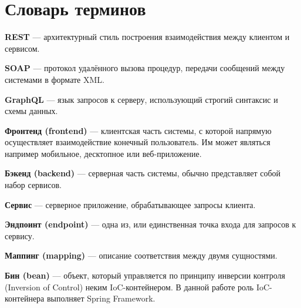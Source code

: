 \chapter*{Словарь терминов}             %

\textbf{REST} --- архитектурный стиль построения взаимодействия между клиентом и сервисом.

\textbf{SOAP} --- протокол удалённого вызова процедур, передачи сообщений между системами в формате XML\@.

\textbf{GraphQL} --- язык запросов к серверу, использующий строгий синтаксис и схемы данных.

\textbf{Фронтенд (frontend)} --- клиентская часть системы, с которой напрямую осуществляет взаимодействие конечный пользователь.
Им может являться например мобильное, десктопное или веб-приложение.

\textbf{Бэкенд (backend)} --- серверная часть системы, обычно представляет собой набор сервисов.

\textbf{Сервис} --- серверное приложение, обрабатывающее запросы клиента.

\textbf{Эндпоинт (endpoint)} --- одна из, или единственная точка входа для запросов к сервису.

\textbf{Маппинг (mapping)} --- описание соответствия между двумя сущностями.

\textbf{Бин (bean)} --- объект, который управляется по принципу инверсии контроля (Inversion of Control) неким IoC-контейнером.
В данной работе роль IoC-контейнера выполняет Spring Framework.
